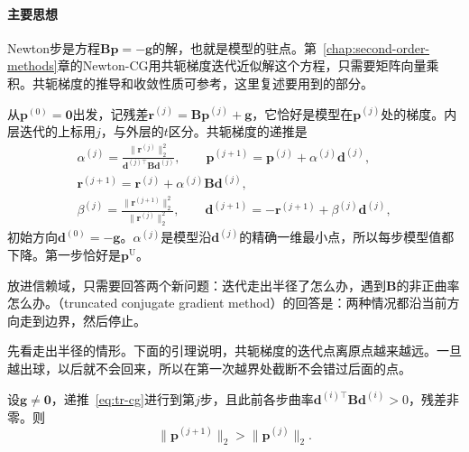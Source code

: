 \paragraph{主要思想}
Newton步是方程$\bm{B}\bm{p}=-\bm{g}$的解，也就是模型的驻点。第~\ref{chap:second-order-methods}章的Newton-CG用共轭梯度迭代近似解这个方程，只需要矩阵向量乘积。共轭梯度的推导和收敛性质可参考，这里复述要用到的部分。

从$\bm{p}^{(0)}=\bm{0}$出发，记残差$\bm{r}^{(j)}=\bm{B}\bm{p}^{(j)}+\bm{g}$，它恰好是模型在$\bm{p}^{(j)}$处的梯度。内层迭代的上标用$j$，与外层的$t$区分。共轭梯度的递推是
\begin{equation}
 \begin{gathered}
  \alpha^{(j)}=\frac{\lVert\bm{r}^{(j)}\rVert_2^2}{\bm{d}^{(j)\top}\bm{B}\bm{d}^{(j)}},\qquad
  \bm{p}^{(j+1)}=\bm{p}^{(j)}+\alpha^{(j)}\bm{d}^{(j)},\\
  \bm{r}^{(j+1)}=\bm{r}^{(j)}+\alpha^{(j)}\bm{B}\bm{d}^{(j)},\\
  \beta^{(j)}=\frac{\lVert\bm{r}^{(j+1)}\rVert_2^2}{\lVert\bm{r}^{(j)}\rVert_2^2},\qquad
  \bm{d}^{(j+1)}=-\bm{r}^{(j+1)}+\beta^{(j)}\bm{d}^{(j)},
 \end{gathered}
 \label{eq:tr-cg}
\end{equation}
初始方向$\bm{d}^{(0)}=-\bm{g}$。$\alpha^{(j)}$是模型沿$\bm{d}^{(j)}$的精确一维最小点，所以每步模型值都下降。第一步恰好是$\bm{p}^{\mathrm{U}}$。

放进信赖域，只需要回答两个新问题：迭代走出半径了怎么办，遇到$\bm{B}$的非正曲率怎么办。（truncated conjugate gradient method）的回答是：两种情况都沿当前方向走到边界，然后停止。

先看走出半径的情形。下面的引理说明，共轭梯度的迭代点离原点越来越远。一旦越出球，以后就不会回来，所以在第一次越界处截断不会错过后面的点。

\begin{lemma}[迭代点的长度递增]
 \label{lem:tr-cg-norm}
 设$\bm{g}\neq\bm{0}$，递推~\eqref{eq:tr-cg}进行到第$j$步，且此前各步曲率$\bm{d}^{(i)\top}\bm{B}\bm{d}^{(i)}>0$，残差非零。则
 \begin{equation}
  \lVert\bm{p}^{(j+1)}\rVert_2>\lVert\bm{p}^{(j)}\rVert_2.
  \label{eq:tr-cg-norm}
 \end{equation}
\end{lemma}

